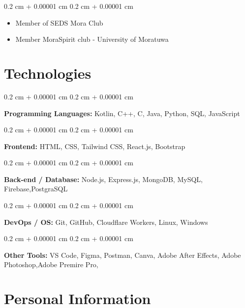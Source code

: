 \documentclass[10pt, letterpaper]{article}
\newenvironment{highlights}{
    \begin{itemize}[
        topsep=0.10 cm,
        parsep=0.10 cm,
        partopsep=0pt,
        itemsep=0pt,
        leftmargin=0.4 cm + 10pt
    ]
}{
    \end{itemize}
} %
\newenvironment{onecolentry}{
    \begin{adjustwidth}{
        0.2 cm + 0.00001 cm
    }{
        0.2 cm + 0.00001 cm
    }
}{
    \end{adjustwidth}
} %
\begin{document}
        
        \begin{onecolentry}{
            
        }
           
            \begin{highlights}
                \item Member of SEDS Mora Club
                \item Member MoraSpirit club - University of Moratuwa
            \end{highlights}
        \end{onecolentry}


        \vspace{0.2 cm}

       



    
    \section{Technologies}

\begin{onecolentry}
    \textbf{Programming Languages:} Kotlin, C++, C, Java, Python, SQL, JavaScript
\end{onecolentry}

\vspace{0.2 cm}

\begin{onecolentry}
    \textbf{Frontend:} HTML, CSS, Tailwind CSS, React.js, Bootstrap
\end{onecolentry}
\vspace{0.2 cm}
\begin{onecolentry}
    \textbf{Back-end / Database:} Node.js, Express.js, MongoDB, MySQL, Firebase,PostgraSQL
\end{onecolentry}
\vspace{0.2 cm}
\begin{onecolentry}
    \textbf{DevOps / OS:} Git, GitHub, Cloudflare Workers, Linux, Windows
\end{onecolentry}
\vspace{0.2 cm}
\begin{onecolentry}
    \textbf{Other Tools:} VS Code, Figma, Postman, Canva,  Adobe After Effects, Adobe Photoshop,Adobe Premire Pro,
\end{onecolentry}





        \section{Personal Information }
\end{document}
